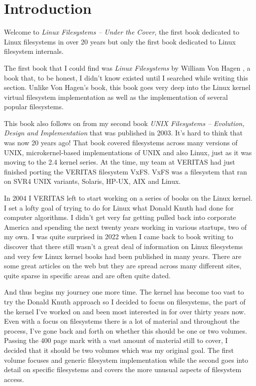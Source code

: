 \chapter{Introduction}

Welcome to \textit{Linux Filesystems -- Under the Cover}, the first book dedicated to Linux filesystems in over 20 years but only the first book dedicated to Linux filesystem internals.

The first book that I could find was \textit{Linux Filesystems} by William Von Hagen \cite{hagen}, a book that, to be honest, I didn't know existed until I searched while writing this section. Unlike Von Hagen's book, this book goes very deep into the Linux kernel virtual filesystem implementation as well as the implementation of several popular filesystems.

This book also follows on from my second book \textit{UNIX Filesystems -- Evolution, Design and Implementation} \cite{pate-filesystems} that was published in 2003. It's hard to think that was now 20 years ago! That book covered filesystems across many versions of UNIX, microkernel-based implementations of UNIX and also Linux, just as it was moving to the 2.4 kernel series. At the time, my team at VERITAS had just finished porting the VERITAS filesystem VxFS. VxFS was a filesystem that ran on SVR4 UNIX variants, Solaris, HP-UX, AIX and Linux.

In 2004 I VERITAS left to start working on a series of books on the Linux kernel. I set a lofty goal of trying to do for Linux what Donald Knuth had done for computer algorithms. I didn't get very far getting pulled back into corporate America and spending the next twenty years working in various startups, two of my own. I was quite surprised in 2022 when I came back to book writing to discover that there still wasn't a great deal of information on Linux filesystems and very few Linux kernel books had been published in many years. There are some great articles on the web but they are spread across many different sites, quite sparse in specific areas and are often quite dated.

And thus begins my journey one more time. The kernel has become too vast to try the Donald Knuth approach so I decided to focus on filesystems, the part of the kernel I've worked on and been most interested in for over thirty years now. Even with a focus on filesystems there is a lot of material and throughout the process, I've gone back and forth on whether this should be one or two volumes. Passing the 400 page mark with a vast amount of material still to cover, I decided that it should be two volumes which was my original goal. The first volume focuses and generic filesystem implementation while the second goes into detail on specific filesystems and covers the more unusual aspects of filesystem access.

